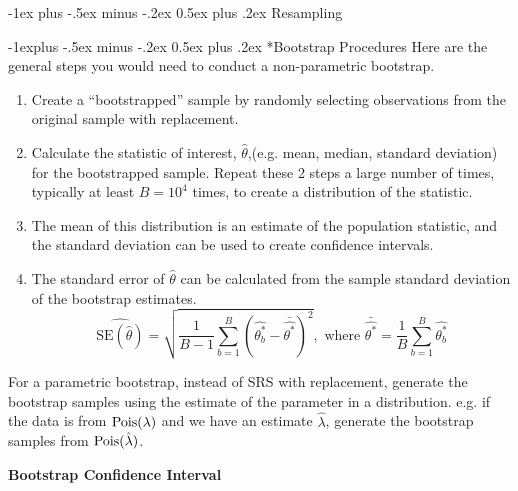 \documentclass[10pt,landscape]{article}
\makeatletter
\renewcommand{\section}{\@startsection{section}{1}{0mm}%
                                {-1ex plus -.5ex minus -.2ex}%
                                {0.5ex plus .2ex}%
                                {\normalfont\large\bfseries}}
\renewcommand{\subsection}{\@startsection{subsection}{2}{0mm}%
                                {-1explus -.5ex minus -.2ex}%
                                {0.5ex plus .2ex}%
                                {\normalfont\normalsize\bfseries}}
\makeatother
\begin{document}
\begin{multicols*}{3}
\section{Resampling}

\subsection*{Bootstrap Procedures}
Here are the general steps you would need to conduct a non-parametric bootstrap.

\begin{enumerate}
    \item Create a ``bootstrapped'' sample by randomly selecting observations from the original sample with replacement. 
    \item Calculate the statistic of interest, $\hat{\theta}$,(e.g. mean, median, standard deviation) for the bootstrapped sample. Repeat these 2 steps a large number of times, typically at least $B=10^4$ times, to create a distribution of the statistic.
    \item The mean of this distribution is an estimate of the population statistic, and the standard deviation can be used to create confidence intervals.
    \item The standard error of $\hat{\theta}$ can be calculated from the sample standard deviation of the bootstrap estimates.
    $$\widehat{\text{SE}(\hat \theta)} =\sqrt{\frac{1}{B-1} \sum_{b=1}^{B}(\hat{\theta_b^*} - \bar{\hat{\theta^*}})^2}, \text{ where } \bar{\hat{\theta^*}} = \frac{1}{B} \sum_{b=1}^{B} \hat{\theta_b^*}$$
\end{enumerate}
For a parametric bootstrap, instead of SRS with replacement, generate the bootstrap samples using the estimate of the parameter in a distribution. e.g. if the data is from $\operatorname{Pois}(\lambda)$ and we have an estimate $\hat\lambda$, generate the bootstrap samples from $\operatorname{Pois}(\hat\lambda)$.

\textbf{Bootstrap Confidence Interval}


\end{multicols*}
\end{document}
